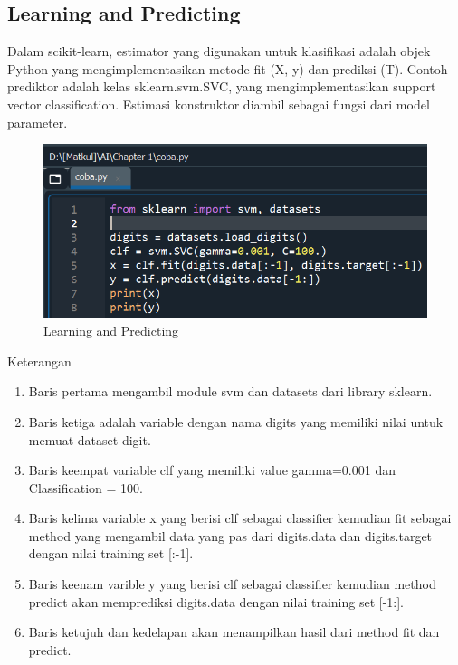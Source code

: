 \subsection{Learning and Predicting}

\par Dalam scikit-learn, estimator yang digunakan untuk klasifikasi adalah objek Python yang mengimplementasikan metode fit (X, y) dan prediksi (T). Contoh prediktor adalah kelas sklearn.svm.SVC, yang mengimplementasikan support vector classification. Estimasi konstruktor diambil sebagai fungsi dari model parameter.

    \begin{figure}[H]
    \centering
    \includegraphics[width=13cm]{figures/1184023/12.PNG}
    \caption{Learning and Predicting}
    \end{figure}

\par Keterangan

    \begin{enumerate}
        \item Baris pertama mengambil module svm dan datasets dari library sklearn.
        \item Baris ketiga adalah variable dengan nama digits yang memiliki nilai untuk memuat dataset digit.
        \item Baris keempat variable clf yang memiliki value gamma=0.001 dan Classification = 100.
        \item Baris kelima variable x yang berisi clf sebagai classifier kemudian fit sebagai method yang mengambil data yang pas dari digits.data dan digits.target dengan nilai training set [:-1].
        \item Baris keenam varible y yang berisi clf sebagai classifier kemudian method predict akan memprediksi digits.data dengan nilai training set [-1:].
        \item Baris ketujuh dan kedelapan akan menampilkan hasil dari method fit dan predict.
    \end{enumerate}

